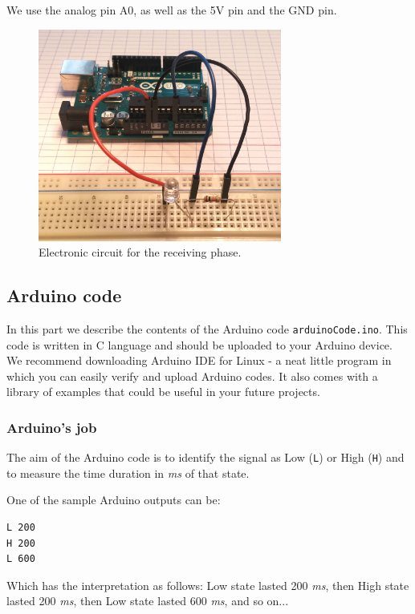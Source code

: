 \documentclass[12pt]{report}
\begin{document}
We use the analog pin A0, as well as the 5V pin and the GND pin.

\begin{figure}[H]
\centering\includegraphics[width=8cm]{receive_circuit}
\caption{Electronic circuit for the receiving phase.}				
\label{fig:receiving_circuit}
\end{figure}




\subsection{Arduino code}

In this part we describe the contents of the Arduino code \verb|arduinoCode.ino|. This code is written in C language and should be uploaded to your Arduino device. We recommend downloading Arduino IDE for Linux - a neat little program in which you can easily verify and upload Arduino codes. It also comes with a library of examples that could be useful in your future projects.

\subsubsection{Arduino's job}

The aim of the Arduino code is to identify the signal as Low (\verb|L|) or High (\verb|H|) and to measure the time duration in \textit{ms} of that state.

One of the sample Arduino outputs can be:

\begin{snugshade}
\begin{verbatim}
L 200
H 200
L 600
\end{verbatim}
\end{snugshade}

Which has the interpretation as follows: Low state lasted 200 \textit{ms}, then High state lasted 200 \textit{ms}, then Low state lasted 600 \textit{ms}, and so on...
\end{document}

